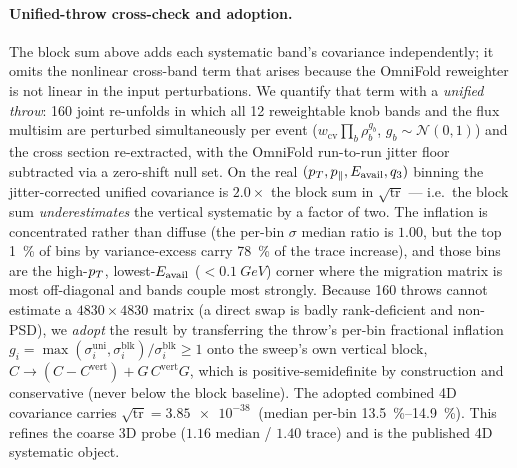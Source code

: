 \paragraph{Unified-throw cross-check and adoption.} The block sum above adds each
systematic band's covariance independently; it omits the nonlinear cross-band term
that arises because the OmniFold reweighter is not linear in the input
perturbations. We quantify that term with a \emph{unified throw}: 160 joint
re-unfolds in which all 12 reweightable knob bands and the flux multisim are
perturbed simultaneously per event ($w_{\mathrm{cv}}\prod_b\rho_b^{g_b}$,
$g_b\sim\mathcal N(0,1)$) and the cross section re-extracted, with the OmniFold
run-to-run jitter floor subtracted via a zero-shift null set. On the real
$(p_{T},p_{\parallel},E_{\mathrm{avail}},q_{3})$ binning the jitter-corrected unified covariance is
$\mathbf{2.0\times}$ the block sum in $\sqrt{\operatorname{tr}}$ --- i.e.\ the
block sum \emph{underestimates} the vertical systematic by a factor of two. The
inflation is concentrated rather than diffuse (the per-bin $\sigma$ median ratio
is $1.00$, but the top \SI{1}{\percent} of bins by variance-excess carry
\SI{78}{\percent} of the trace increase), and those bins are the high-$p_{T}$,
lowest-$E_{\mathrm{avail}}$ ($<\SI{0.1}{GeV}$) corner where the migration matrix is most
off-diagonal and bands couple most strongly. Because 160 throws cannot estimate a
$4830\times4830$ matrix (a direct swap is badly rank-deficient and non-PSD), we
\emph{adopt} the result by transferring the throw's per-bin fractional inflation
$g_i=\max(\sigma^{\mathrm{uni}}_i,\sigma^{\mathrm{blk}}_i)/\sigma^{\mathrm{blk}}_i\ge1$
onto the sweep's own vertical block, $C\to(C-C^{\mathrm{vert}})+G\,C^{\mathrm{vert}}G$,
which is positive-semidefinite by construction and conservative (never below the
block baseline). The adopted combined 4D covariance carries
$\sqrt{\operatorname{tr}}=\SI{3.85e-38}{}$ (median per-bin
\SIrange{13.5}{14.9}{\percent}). This refines the coarse 3D probe
($1.16$ median / $1.40$ trace) and is the published 4D systematic object.
